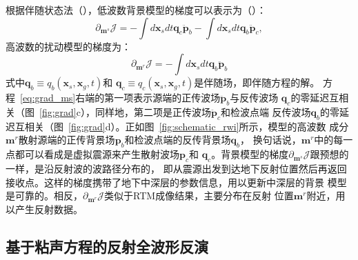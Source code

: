 根据伴随状态法（），低波数背景模型的梯度可以表示为（）：
\begin{equation}
	\partial_{\mathbf{m}^s}\mathcal{J}=-\int d\mathbf{x}_sdt\mathbf{q}_c\ddot{\mathbf{p}}_b
	-\int d\mathbf{x}_sdt\mathbf{q}_b\ddot{\mathbf{p}}_c,
	\label{eq:grad_ms}
\end{equation}
高波数的扰动模型的梯度为：
\begin{equation}
	\partial_{\mathbf{m}^r}\mathcal{J}=-\int d\mathbf{x}_sdt\mathbf{q}_b\ddot{\mathbf{p}}_b
\end{equation}
式中$\mathbf{q}_b\equiv q_b(\mathbf{x}_s,\mathbf{x}_g,t)$和
$\mathbf{q}_c\equiv q_c(\mathbf{x}_s,\mathbf{x}_g,t)$是伴随场，即伴随方程的解。
方程~\ref{eq:grad_ms}右端的第一项表示源端的正传波场$\ddot{\mathbf{p}}_b$与反传波场
$\mathbf{q}_c$的零延迟互相关（图~\ref{fig:grad}c），同样地，第二项是正传波场$\ddot{\mathbf{p}}_c$和检波点端
反传波场$\mathbf{q}_b$的零延迟互相关（图~\ref{fig:grad}d）。正如图~\ref{fig:schematic_rwi}所示，模型的高波数
成分$\mathbf{m}^r$散射源端的正传背景场$\mathbf{p}_b$和检波点端的反传背景场$\mathbf{q}_b$，
换句话说，$\mathbf{m}^r$中的每一点都可以看成是虚拟震源来产生散射波场$\mathbf{p}_c$和
$\mathbf{q}_c$。背景模型的梯度$\partial_{\mathbf{m}^s}\mathcal{J}$跟预想的一样，是沿反射波的波路径分布的，
即从震源出发到达地下反射位置然后再返回接收点。这样的梯度携带了地下中深层的参数信息，用以更新中深层的背景
模型是可靠的。相反，$\partial_{\mathbf{m}^r}\mathcal{J}$类似于RTM成像结果，主要分布在反射
位置$\mathbf{m}^r$附近，用以产生反射数据。

\newpage
\subsection{基于粘声方程的反射全波形反演}
\vspace{0.5cm}

